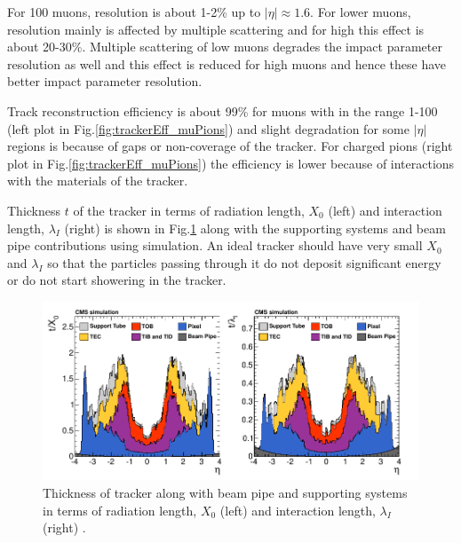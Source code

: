 For 100 \gev muons, \pt resolution is about 1-2\% up to $|\eta| \approx 1.6$. For lower \pt muons, resolution mainly is affected by multiple scattering and for high \pt this effect is about 20-30\%. Multiple scattering of low \pt muons degrades the impact parameter resolution as well and this effect is reduced for high \pt muons and hence these have better impact parameter resolution.

Track reconstruction efficiency is about 99\% for muons with \pt in the range 1-100 \gev (left plot in Fig.\ref{fig:trackerEff_muPions}) 
and slight degradation for some $|\eta|$ regions is because of gaps or non-coverage of the tracker. For charged pions (right plot in 
Fig.\ref{fig:trackerEff_muPions}) the efficiency is lower because of interactions with the materials of the tracker. 

Thickness $t$ of the 
tracker in terms of radiation length, $X_0$ (left) and interaction length, $\lambda_I$ (right) is shown in Fig.\ref{fig:tracker_material} 
along with the supporting systems and beam pipe contributions using simulation. An ideal tracker should have very small $X_0$ and 
$\lambda_I$ so that the particles passing through it do not deposit significant energy or do not start showering in the tracker.

\begin{figure}[h!]
\centering
\includegraphics[width=0.98\linewidth]{../Figures/Chap2/tracker_material}
\caption[Tracker material budget]{Thickness of tracker along with beam pipe and supporting systems in terms of radiation length, $X_0$ (left) and interaction length, $\lambda_I$ (right) \cite{Collaboration_2014}.}
\label{fig:tracker_material}
\end{figure}

